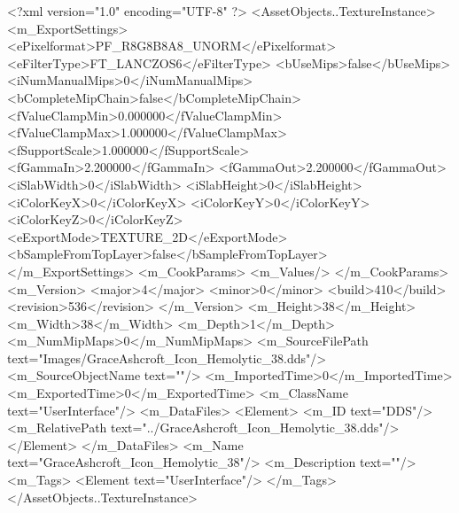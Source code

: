 <?xml version="1.0" encoding="UTF-8" ?>
<AssetObjects..TextureInstance>
	<m_ExportSettings>
		<ePixelformat>PF_R8G8B8A8_UNORM</ePixelformat>
		<eFilterType>FT_LANCZOS6</eFilterType>
		<bUseMips>false</bUseMips>
		<iNumManualMips>0</iNumManualMips>
		<bCompleteMipChain>false</bCompleteMipChain>
		<fValueClampMin>0.000000</fValueClampMin>
		<fValueClampMax>1.000000</fValueClampMax>
		<fSupportScale>1.000000</fSupportScale>
		<fGammaIn>2.200000</fGammaIn>
		<fGammaOut>2.200000</fGammaOut>
		<iSlabWidth>0</iSlabWidth>
		<iSlabHeight>0</iSlabHeight>
		<iColorKeyX>0</iColorKeyX>
		<iColorKeyY>0</iColorKeyY>
		<iColorKeyZ>0</iColorKeyZ>
		<eExportMode>TEXTURE_2D</eExportMode>
		<bSampleFromTopLayer>false</bSampleFromTopLayer>
	</m_ExportSettings>
	<m_CookParams>
		<m_Values/>
	</m_CookParams>
	<m_Version>
		<major>4</major>
		<minor>0</minor>
		<build>410</build>
		<revision>536</revision>
	</m_Version>
	<m_Height>38</m_Height>
	<m_Width>38</m_Width>
	<m_Depth>1</m_Depth>
	<m_NumMipMaps>0</m_NumMipMaps>
	<m_SourceFilePath text="Images/GraceAshcroft_Icon_Hemolytic_38.dds"/>
	<m_SourceObjectName text=""/>
	<m_ImportedTime>0</m_ImportedTime>
	<m_ExportedTime>0</m_ExportedTime>
	<m_ClassName text="UserInterface"/>
	<m_DataFiles>
		<Element>
			<m_ID text="DDS"/>
			<m_RelativePath text="../GraceAshcroft_Icon_Hemolytic_38.dds"/>
		</Element>
	</m_DataFiles>
	<m_Name text="GraceAshcroft_Icon_Hemolytic_38"/>
	<m_Description text=""/>
	<m_Tags>
		<Element text="UserInterface"/>
	</m_Tags>
</AssetObjects..TextureInstance>
